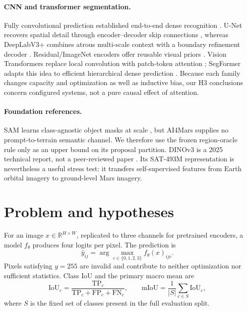 \documentclass{article}
\newcommand{\miou}{\ensuremath{\mathrm{mIoU}}}
\newcommand{\ignore}{\ensuremath{y=255}}
\begin{document}
\paragraph{CNN and transformer segmentation.}
Fully convolutional prediction established end-to-end dense recognition \cite{long2015fcn}.
U-Net recovers spatial detail through encoder--decoder skip connections
\cite{ronneberger2015unet}, whereas DeepLabV3+ combines atrous multi-scale context with a boundary
refinement decoder \cite{chen2018deeplab}. Residual/ImageNet encoders offer reusable visual priors
\cite{he2016resnet,deng2009imagenet}. Vision Transformers replace local convolution with
patch-token attention \cite{dosovitskiy2021vit}; SegFormer adapts this idea to efficient
hierarchical dense prediction \cite{xie2021segformer}. Because each family changes capacity and
optimization as well as inductive bias, our H3 conclusions concern configured systems, not a pure
causal effect of attention.

\paragraph{Foundation references.}
SAM learns class-agnostic object masks at scale \cite{kirillov2023sam}, but AI4Mars supplies no
prompt-to-terrain semantic channel. We therefore use the frozen region-oracle rule only as an
upper bound on its proposal partition. DINOv3 is a 2025 technical report, not a peer-reviewed
paper \cite{simeoni2025dinov3}. Its SAT-493M representation is nevertheless a useful stress test:
it transfers self-supervised features from Earth orbital imagery to ground-level Mars imagery.

\section{Problem and hypotheses}

For an image $x\in\mathbb{R}^{H\times W}$, replicated to three channels for pretrained encoders,
a model $f_\theta$ produces four logits per pixel. The prediction is
\begin{equation}
  \hat y_{ij}=\arg\max_{c\in\{0,1,2,3\}} f_\theta(x)_{ijc}.
\end{equation}
Pixels satisfying \ignore{} are invalid and contribute to neither optimization nor sufficient
statistics. Class IoU and the primary macro mean are
\begin{equation}
  \mathrm{IoU}_c=\frac{\mathrm{TP}_c}{\mathrm{TP}_c+\mathrm{FP}_c+\mathrm{FN}_c},
  \qquad \miou=\frac{1}{|S|}\sum_{c\in S}\mathrm{IoU}_c,
\end{equation}
where $S$ is the fixed set of classes present in the full evaluation split.
\end{document}
